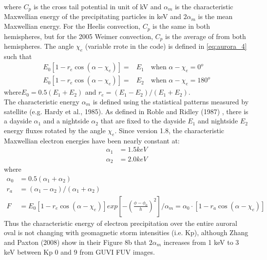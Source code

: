%   
where $C_p$ is the cross tail potential in unit of kV and $\alpha_m$
is the characteristic Maxwellian energy of the precipitating particles
in keV and $2\alpha_m$ is the mean Maxwellian energy.
For the Heelis convection, $C_p$ is the same in both hemispheres,
but for the 2005 Weimer convection, $C_p$ is the average of 
from both hemispheres.
%
The angle $\chi_e$ (variable rrote in the code) is defined in \ref{eq:aurora_4}
such that
%
\begin{equation}
  \begin{split}
    E_0 [1-r_e \cos(\alpha -\chi_e)] =& E_1 \quad \text{when } \alpha - \chi_e = 0^o \\
    E_0 [1-r_e \cos(\alpha -\chi_e)] =& E_2 \quad  \text{when } \alpha - \chi_e = 180^o
  \end{split}  
    \label{eq:aurora_7}
\end{equation}
%   
where$E_0 = 0.5(E_1+E_2)$  and $r_e = (E_1-E_2)/(E_1+E_2)$. \\
%   
The characteristic energy $\alpha_m$ is defined using the 
statistical patterns measured by satellite (e.g. Hardy et al., 1985).
As defined in Roble and Ridley (1987) \cite{roble1987}, there is a
dayside $\alpha_1$ and a nightside $\alpha_2$ that are fixed to the
dayside $E_1$ and nightside $E_2$ energy fluxes rotated by the angle
$\chi_e$.  Since version 1.8, the characteristic Maxwellian electron
energies have been nearly constant at:
%
\begin{equation}
  \begin{split}
    \alpha_1 & = 1.5 keV \\
    \alpha_2 & = 2.0 keV
    \label{eq:aurora_9}
  \end{split}
\end{equation}
%   
where
\begin{equation}
  \begin{split}
    \alpha_0 & = 0.5(\alpha_1+\alpha_2) \\
    r_a  &= (\alpha_1-\alpha_2)/(\alpha_1+\alpha_2) \\
   F & = E_0 [1-r_e \cos(\alpha - \chi_e)]exp[-(\frac{\phi-\phi_0}{h})^2]/ 
    \alpha_m  = \alpha_0 \cdot [1 - r_a \cos(\alpha - \chi_e)]
    \label{eq:aurora_8}
  \end{split}
\end{equation}
Thus the characteristic
energy of electron precipitation over the entire auroral oval is not 
changing with geomagnetic storm intensities (i.e. Kp), although Zhang
and Paxton (2008) \cite{zhang2008} show in their Figure 8b that
$2\alpha_m$ increases from 1 keV to 3 keV between Kp 0 and 9 from
GUVI FUV images.
%
